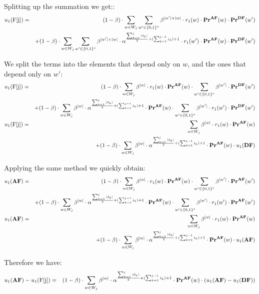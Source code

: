Splitting up the summation we get::
\begin{eqnarray*}
u_1(\text{\rm F[{j}]})& = & (1-\beta)\cdot\sum_{w \in W_j}  \sum_{w'\in \{0,1\}^*}\beta^{|w'|+|w|}\cdot r_1(w) \cdot \mathbf{Pr}^{\text{\rm {\bf AF}}}(w)\cdot\mathbf{Pr}^{\text{\rm {\bf DF}}}(w')
\\ && + (1-\beta)\cdot\sum_{w \in W_j}  \sum_{w'\in \{0,1\}^*}\beta^{|w'|+|w|}\cdot \alpha^{\frac{\sum_{k=1}^{j} |d_k|}{2}+(\sum_{k=1}^{j-1} i_k) +1}\cdot r_1(w') \cdot \mathbf{Pr}^{\text{\rm {\bf AF}}}(w)\cdot\mathbf{Pr}^{\text{\rm {\bf DF}}}(w')
\end{eqnarray*}

We split the terms into the elements that depend only on $w$, and the ones that depend only on $w'$:
\begin{eqnarray*}
u_1(\text{\rm F[{j}]})& = & (1-\beta)\cdot\sum_{w \in W_j}  \beta^{|w|}\cdot r_1(w) \cdot \mathbf{Pr}^{\text{\rm {\bf AF}}}(w)\cdot \sum_{w'\in \{0,1\}^*}  \beta^{|w'|} \cdot \mathbf{Pr}^{\text{\rm {\bf DF}}}(w')
\\ && + (1-\beta)\cdot\sum_{w \in W_j}  \beta^{|w|}\cdot \alpha^{\frac{\sum_{k=1}^{j} |d_k|}{2}+(\sum_{k=1}^{j-1} i_k) +1} \cdot \mathbf{Pr}^{\text{\rm {\bf AF}}}(w) \cdot  \sum_{w'\in \{0,1\}^*} \beta^{|w'|} \cdot r_1(w') \cdot\mathbf{Pr}^{\text{\rm {\bf DF}}}(w') \\
u_1(\text{\rm F[{j}]})& = & \sum_{w \in W_j}  \beta^{|w|}\cdot r_1(w) \cdot \mathbf{Pr}^{\text{\rm {\bf AF}}}(w)
\\ && + (1-\beta)\cdot\sum_{w \in W_j}  \beta^{|w|}\cdot \alpha^{\frac{\sum_{k=1}^{j} |d_k|}{2}+(\sum_{k=1}^{j-1} i_k) +1} \cdot \mathbf{Pr}^{\text{\rm {\bf AF}}}(w) \cdot  u_1(\text{\rm {\bf DF}}) \\
\end{eqnarray*}

Applying the same method we quickly obtain:
\begin{eqnarray*}
u_1(\text{\rm {\bf AF}})& = & (1-\beta)\cdot\sum_{w \in W_j}  \beta^{|w|}\cdot r_1(w) \cdot \mathbf{Pr}^{\text{\rm {\bf AF}}}(w)\cdot \sum_{w'\in \{0,1\}^*}  \beta^{|w'|} \cdot \mathbf{Pr}^{\text{\rm {\bf AF}}}(w')
\\ && + (1-\beta)\cdot\sum_{w \in W_j}  \beta^{|w|}\cdot \alpha^{\frac{\sum_{k=1}^{j} |d_k|}{2}+(\sum_{k=1}^{j-1} i_k) +1} \cdot \mathbf{Pr}^{\text{\rm {\bf AF}}}(w) \cdot  \sum_{w'\in \{0,1\}^*} \beta^{|w'|} \cdot r_1(w') \cdot\mathbf{Pr}^{\text{\rm {\bf AF}}}(w')\\
u_1(\text{\rm {\bf AF}})& = & \sum_{w \in W_j}  \beta^{|w|}\cdot r_1(w) \cdot \mathbf{Pr}^{\text{\rm {\bf AF}}}(w)
\\ && + (1-\beta)\cdot\sum_{w \in W_j}  \beta^{|w|}\cdot \alpha^{\frac{\sum_{k=1}^{j} |d_k|}{2}+(\sum_{k=1}^{j-1} i_k) +1} \cdot \mathbf{Pr}^{\text{\rm {\bf AF}}}(w) \cdot  u_1(\text{\rm {\bf AF}})
\end{eqnarray*}

Therefore we have: 
\begin{eqnarray*}
u_1(\text{\rm {\bf AF}}) - u_1(\text{\rm F[{j}]}) & = & (1-\beta)\cdot\sum_{w \in W_j}  \beta^{|w|}\cdot \alpha^{\frac{\sum_{k=1}^{j} |d_k|}{2}+(\sum_{k=1}^{j-1} i_k) +1} \cdot \mathbf{Pr}^{\text{\rm {\bf AF}}}(w) \cdot (u_1(\text{\rm {\bf AF}}) - u_1(\text{\rm {\bf DF}}))
\end{eqnarray*}

